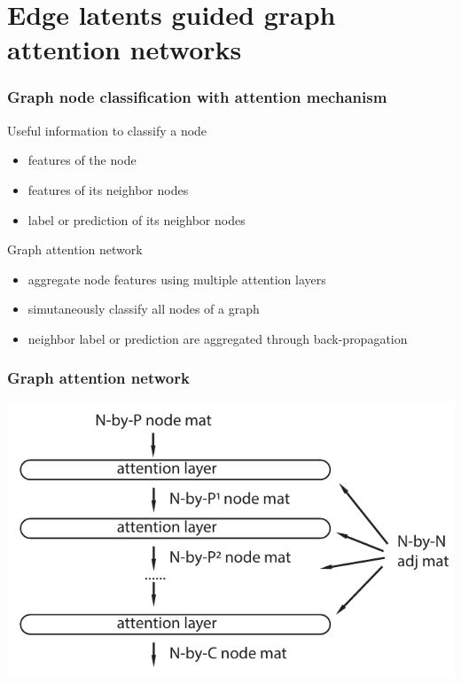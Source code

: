 \documentclass[compress]{beamer}
\begin{document}
\section{Edge latents guided graph attention networks}

\begin{frame}
  \frametitle{Graph node classification with attention mechanism}
  \begin{block}{Useful information to classify a node}
    \begin{itemize}
    \item features of the node
    \item features of its neighbor nodes
    \item label or prediction of its neighbor nodes
    \end{itemize}
  \end{block}
  \begin{block}{Graph attention network}
    \begin{itemize}
    \item aggregate node features using multiple attention layers
    \item simutaneously classify all nodes of a graph
    \item neighbor label or prediction are aggregated through back-propagation
    \end{itemize}
  \end{block}
\end{frame}

\begin{frame}
  \frametitle{Graph attention network}
  \begin{center}
    \includegraphics[scale=0.8]{gat_overview.pdf}
  \end{center}
\end{frame}
\end{document}
